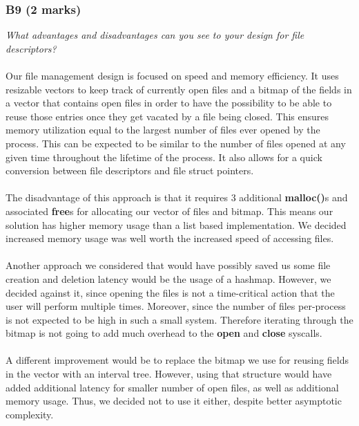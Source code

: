 \documentclass{report}
\newcommand{\question}[1]{\textit{#1} \ }
\newcommand{\fun}[1]{\textcolor{Emerald}{\textbf{#1}}}
\begin{document}
            \subsubsection*{B9 (2 marks)}
                \question{What advantages and disadvantages can you see to your design for file descriptors?}
								\\
								\\ Our file management design is focused on speed and memory efficiency. It uses resizable vectors to
								keep track of currently open files and a bitmap of the fields in a vector that contains open files
								in order to have the possibility to be able to reuse those entries once they get vacated by a file being closed. This ensures
								memory utilization equal to the largest number of files ever opened by the process. This can be expected to be similar
								to the number of files opened at any given time throughout the lifetime of the process. It also allows for a
								quick conversion between file descriptors and file struct pointers.
								\\
								\\ The disadvantage of this approach is that it requires 3 additional \fun{malloc()}s and associated \fun{free}s for allocating our vector of files and bitmap. 
                                This means our solution has higher memory usage than a list based implementation. We decided increased memory usage was well worth the increased speed of accessing files.
                                \\
                                \\ Another approach we considered that would have possibly saved us some file creation and deletion latency would be the usage of a hashmap.
                                However, we decided against it, since opening the files is not a time-critical action that the user will perform multiple times. 
                                Moreover, since the number of files per-process is not expected to be high in such a small system.
                                Therefore iterating through the bitmap is not going to add much overhead to the \fun{open} and \fun{close} syscalls.
                                \\
                                \\ A different improvement would be to replace the bitmap we use for reusing fields in the vector with an interval tree.
                                However, using that structure would have added additional latency for smaller number of open files, as well as additional memory usage. Thus, we decided not to use it either, despite better
                                asymptotic complexity.
\end{document}
